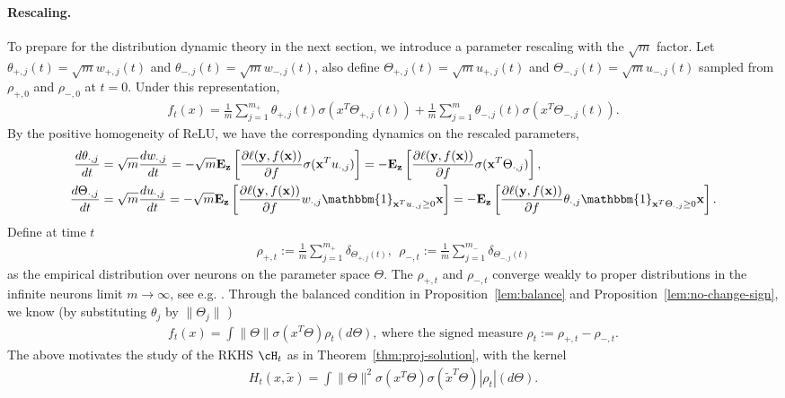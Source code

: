 \documentclass[11pt]{article}
\numberwithin{equation}{section}
\def\bd#1{\mathbf{#1}}
\def\bx{\bd{x}}
\def\by{\bd{y}}
\begin{document}
\paragraph{Rescaling.}
To prepare for the distribution dynamic theory in the next section, we introduce a parameter rescaling with the $\sqrt{m}$ factor. Let $\theta_{+,j}(t) = \sqrt{m}w_{+,j}(t)$ and $\theta_{-,j}(t)=\sqrt{m}w_{-,j}(t)$, also define $\Theta_{+,j}(t) = \sqrt{m}u_{+,j}(t)$ and $\Theta_{-,j}(t)= \sqrt{m}u_{-,j}(t)$ sampled from $\rho_{+, 0}$ and $\rho_{-, 0}$ at $t = 0$. Under this representation,
\begin{align}
    \label{eq:rescaled-representation}
    f_t(x) = \frac{1}{m}\sum_{j=1}^{m_{+}} \theta_{+,j}(t)\sigma(x^T\Theta_{+,j}(t))+ \frac{1}{m}\sum_{j=1}^{m} \theta_{-,j}(t)\sigma(x^T\Theta_{-,j}(t)).
\end{align}
By the positive homogeneity of ReLU, we have the corresponding dynamics on the rescaled parameters,
 \begin{align}
    \frac{d\theta_{\cdot,j}}{dt} &= \sqrt{m} \frac{d w_{\cdot,j}}{dt}=  -\sqrt{m}\mathbf{E}_{\bd{z}}\left[\frac{\partial \ell(\by,f(\bx))}{\partial f}\sigma(\bx^Tu_{\cdot,j})\right] = -\mathbf{E}_{\bd{z}}\left[\frac{\partial \ell(\by,f(\bx))}{\partial f}\sigma(\bx^T\Theta_{\cdot,j})\right], \label{def:training-rescale_1}\\
    \frac{d\Theta_{\cdot,j}}{dt} &= \sqrt{m} \frac{d u_{\cdot,j}}{dt}= -\sqrt{m}\mathbf{E}_{\bd{z}}\left[\frac{\partial \ell(\by,f(\bx))}{\partial f}w_{\cdot, j} \mathbbm{1}_{\bx^Tu_{\cdot, j}\geq0}\bx\right] = -\mathbf{E}_{\bd{z}}\left[\frac{\partial \ell(\by,f(\bx))}{\partial f}\theta_{\cdot, j}\mathbbm{1}_{\bx^T\Theta_{\cdot, j}\geq0}\bx\right].\label{def:training-rescale_4}
\end{align} 
Define at time $t$
\begin{align}
    \label{eq:sign-measure}
    \rho_{+, t} := \frac{1}{m} \sum_{j=1}^{m_{+}} \delta_{\Theta_{+, j}(t)}, ~~ \rho_{-, t} := \frac{1}{m} \sum_{j=1}^{m_{-}} \delta_{\Theta_{-, j}(t)}
\end{align}
as the empirical distribution over neurons on the parameter space $\Theta$. The $\rho_{+, t}$ and $\rho_{-, t}$ converge weakly to proper distributions in the infinite neurons limit $m\rightarrow \infty$, see e.g. \cite{bach2017breaking, mei2018mean}.
Through the balanced condition in Proposition~\ref{lem:balance} and Proposition~\ref{lem:no-change-sign}, we know (by substituting $\theta_j$ by $\|\Theta_j\|$ )
\begin{align}\label{def:para-nn}
     f_t(x) = \int \|\Theta\|\sigma(x^T\Theta)\rho_t(d\Theta), ~\text{where the signed measure $\rho_t := \rho_{+, t} - \rho_{-, t}$}.
\end{align}
The above motivates the study of the RKHS $\cH_t$ as in Theorem~\ref{thm:proj-solution}, with the kernel
\begin{align}
    \label{eq:h}
    H_t(x, \tilde{x}) = \int \| \Theta \|^2 \sigma(x^T\Theta) \sigma(\tilde x^T\Theta) |\rho_t|(d \Theta).
\end{align}
\end{document}
